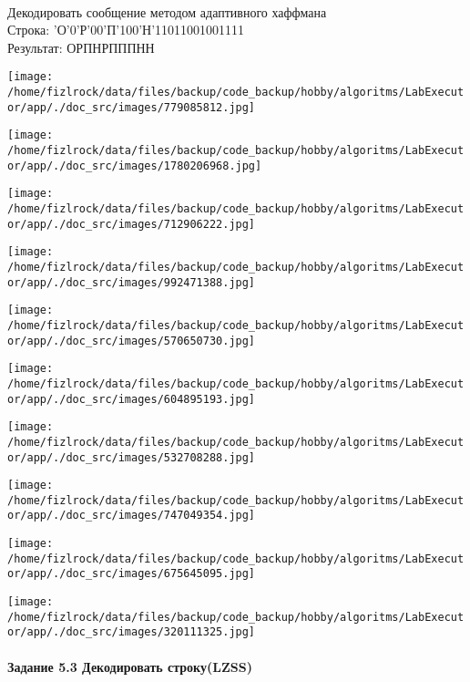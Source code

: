 \documentclass[a4paper, 12pt]{article}
\begin{document}
\\ 

Декодировать сообщение методом адаптивного хаффмана \\
Строка: 
'О'0'Р'00'П'100'Н'11011001001111\\
Результат: ОРПНРПППНН

\texttt{[image: /home/fizlrock/data/files/backup/code\_backup/hobby/algoritms/LabExecutor/app/./doc\_src/images/779085812.jpg]}

\texttt{[image: /home/fizlrock/data/files/backup/code\_backup/hobby/algoritms/LabExecutor/app/./doc\_src/images/1780206968.jpg]}

\texttt{[image: /home/fizlrock/data/files/backup/code\_backup/hobby/algoritms/LabExecutor/app/./doc\_src/images/712906222.jpg]}

\texttt{[image: /home/fizlrock/data/files/backup/code\_backup/hobby/algoritms/LabExecutor/app/./doc\_src/images/992471388.jpg]}

\texttt{[image: /home/fizlrock/data/files/backup/code\_backup/hobby/algoritms/LabExecutor/app/./doc\_src/images/570650730.jpg]}

\texttt{[image: /home/fizlrock/data/files/backup/code\_backup/hobby/algoritms/LabExecutor/app/./doc\_src/images/604895193.jpg]}

\texttt{[image: /home/fizlrock/data/files/backup/code\_backup/hobby/algoritms/LabExecutor/app/./doc\_src/images/532708288.jpg]}

\texttt{[image: /home/fizlrock/data/files/backup/code\_backup/hobby/algoritms/LabExecutor/app/./doc\_src/images/747049354.jpg]}

\texttt{[image: /home/fizlrock/data/files/backup/code\_backup/hobby/algoritms/LabExecutor/app/./doc\_src/images/675645095.jpg]}

\texttt{[image: /home/fizlrock/data/files/backup/code\_backup/hobby/algoritms/LabExecutor/app/./doc\_src/images/320111325.jpg]}
\pagebreak
\paragraph{Задание 5.3 Декодировать строку(LZSS)\\}
\end{document}
